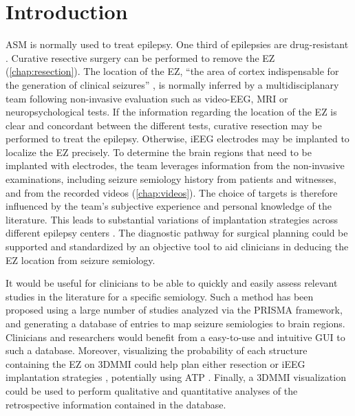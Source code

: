 \section{Introduction}

\Ac{ASM} is normally used to treat epilepsy.
One third of epilepsies are drug-resistant \cite{engel_what_2016}.
Curative resective surgery can be performed to remove the \ac{EZ} (\cref{chap:resection}).
The location of the \ac{EZ}, ``the area of cortex indispensable for the generation of clinical seizures'' \cite{rosenow_presurgical_2001}, is normally inferred by a multidisciplanary team following non-invasive evaluation such as video-\ac{EEG}, \ac{MRI} or neuropsychological tests.
If the information regarding the location of the \ac{EZ} is clear and concordant between the different tests, curative resection may be performed to treat the epilepsy.
Otherwise, \ac{iEEG} electrodes may be implanted to localize the \ac{EZ} precisely.
To determine the brain regions that need to be implanted with electrodes, the team leverages information from the non-invasive examinations, including seizure semiology history from patients and witnesses, and from the recorded videos (\cref{chap:videos}).  %
The choice of targets is therefore influenced by the team's subjective experience and personal knowledge of the literature.
This leads to substantial variations of implantation strategies across different epilepsy centers \cite{tufenkjian_seizure_2012}.
The diagnostic pathway for surgical planning could be supported and standardized by an objective tool to aid clinicians in deducing the \ac{EZ} location from seizure semiology.

It would be useful for clinicians to be able to quickly and easily assess relevant studies in the literature for a specific semiology.
Such a method has been proposed \cite{alim-marvasti_probabilistic_2021} using a large number of studies analyzed via the \ac{PRISMA} framework, and generating a database of entries to map seizure semiologies to brain regions.
Clinicians and researchers would benefit from a easy-to-use and intuitive \ac{GUI} to such a database.
Moreover, visualizing the probability of each structure containing the \ac{EZ} on \ac{3DMMI} could help plan either resection or \ac{iEEG} implantation strategies \cite{nowell_resection_2017, nowell_utility_2015}, potentially using \ac{ATP} \cite{sparks_automated_2017}.
Finally, a \ac{3DMMI} visualization could be used to perform qualitative and quantitative analyses of the retrospective information contained in the database.

